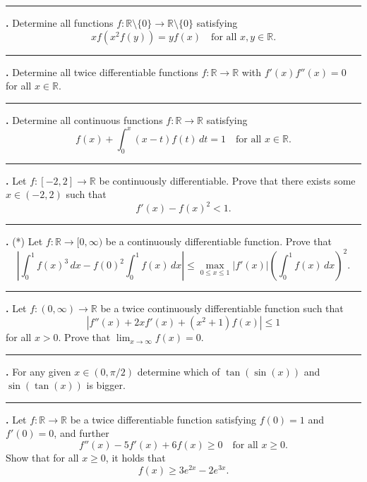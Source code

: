\documentclass[11pt]{article}
\newcounter{probnum}
\newenvironment{problembox}{\par\noindent\rule{\linewidth}{0.5pt}\vspace{5pt}\par}{\vspace{2pt}}
\begin{document}
\begin{problembox}
\textbf{\theprobnum.} Determine all functions $f : \mathbb{R} \setminus \{0\} \to \mathbb{R} \setminus \{0\}$ satisfying
\[
x f(x^2 f(y)) = y f(x) \quad \text{for all } x, y \in \mathbb{R}.
\]
\end{problembox}

\begin{problembox}
\textbf{\theprobnum.} Determine all twice differentiable functions $f : \mathbb{R} \to \mathbb{R}$ with $f'(x) f''(x) = 0$ for all $x \in \mathbb{R}$.
\end{problembox}

\begin{problembox}
\textbf{\theprobnum.} Determine all continuous functions $f : \mathbb{R} \to \mathbb{R}$ satisfying
\[
f(x) + \int_0^x (x-t) f(t)\,dt = 1 \quad \text{for all } x \in \mathbb{R}.
\]
\end{problembox}

\begin{problembox}
\textbf{\theprobnum.} Let $f : [-2,2] \to \mathbb{R}$ be continuously differentiable. Prove that there exists some $x \in (-2,2)$ such that
\[
f'(x) - f(x)^2 < 1.
\]
\end{problembox}

\begin{problembox}
\textbf{\theprobnum.} (*) Let $f : \mathbb{R} \to [0,\infty)$ be a continuously differentiable function. Prove that
\[
\left| \int_0^1 f(x)^3\,dx - f(0)^2 \int_0^1 f(x)\,dx \right| \le \max_{0 \le x \le 1} |f'(x)| \left( \int_0^1 f(x)\,dx \right)^2.
\]
\end{problembox}

\begin{problembox}
\textbf{\theprobnum.} Let $f : (0,\infty) \to \mathbb{R}$ be a twice continuously differentiable function such that
\[
|f''(x) + 2x f'(x) + (x^2+1) f(x)| \le 1
\]
for all $x > 0$. Prove that $\lim_{x \to \infty} f(x) = 0$.
\end{problembox}

\begin{problembox}
\textbf{\theprobnum.} For any given $x \in (0,\pi/2)$ determine which of $\tan(\sin(x))$ and $\sin(\tan(x))$ is bigger.
\end{problembox}

\begin{problembox}
\textbf{\theprobnum.} Let $f : \mathbb{R} \to \mathbb{R}$ be a twice differentiable function satisfying $f(0) = 1$ and $f'(0) = 0$, and further
\[
f''(x) - 5f'(x) + 6f(x) \ge 0 \quad \text{for all } x \ge 0.
\]
Show that for all $x \ge 0$, it holds that
\[
f(x) \ge 3e^{2x} - 2e^{3x}.
\]
\end{problembox}
\end{document}
